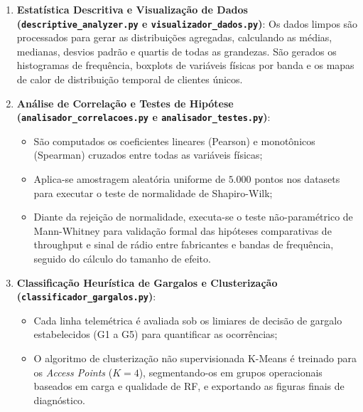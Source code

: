\begin{enumerate}
    Nesta etapa, o dataset consolidado é refinado por meio das seguintes operações:
    \begin{itemize}
        \item Remoção de instâncias corrompidas ou com identificadores físicos (MAC do AP ou Cliente) nulos;
        \item Conversão e unificação de escalas físicas (sinal recebido convertido e normalizado para dBm, throughput estimado convertido incrementalmente para Mbps);
        \item Anonimização criptográfica de privacidade dos MACs de clientes via algoritmo SHA-256, gerando hashes unidirecionais em conformidade com as diretrizes da LGPD;
        \item Mapeamento lógico de identificadores, convertendo MACs de gerência do Ruckus para etiquetas legíveis simplificadas (\texttt{RK-XXXX}) e associando os APs UniFi aos seus respectivos nomes físicos cadastrados.
    \end{itemize}
    Ao final desta fase, os datasets finais padronizados são persistidos em disco.
    \item \textbf{Estatística Descritiva e Visualização de Dados (\texttt{descriptive\_analyzer.py} e \texttt{visualizador\_dados.py})}:
    Os dados limpos são processados para gerar as distribuições agregadas, calculando as médias, medianas, desvios padrão e quartis de todas as grandezas. São gerados os histogramas de frequência, boxplots de variáveis físicas por banda e os mapas de calor de distribuição temporal de clientes únicos.
    \item \textbf{Análise de Correlação e Testes de Hipótese (\texttt{analisador\_correlacoes.py} e \texttt{analisador\_testes.py})}:
    \begin{itemize}
        \item São computados os coeficientes lineares (Pearson) e monotônicos (Spearman) cruzados entre todas as variáveis físicas;
        \item Aplica-se amostragem aleatória uniforme de $5.000$ pontos nos datasets para executar o teste de normalidade de Shapiro-Wilk;
        \item Diante da rejeição de normalidade, executa-se o teste não-paramétrico de Mann-Whitney para validação formal das hipóteses comparativas de throughput e sinal de rádio entre fabricantes e bandas de frequência, seguido do cálculo do tamanho de efeito.
    \end{itemize}
    \item \textbf{Classificação Heurística de Gargalos e Clusterização (\texttt{classificador\_gargalos.py})}:
    \begin{itemize}
        \item Cada linha telemétrica é avaliada sob os limiares de decisão de gargalo estabelecidos (G1 a G5) para quantificar as ocorrências;
        \item O algoritmo de clusterização não supervisionada K-Means é treinado para os \textit{Access Points} ($K=4$), segmentando-os em grupos operacionais baseados em carga e qualidade de RF, e exportando as figuras finais de diagnóstico.
    \end{itemize}
\end{enumerate}

